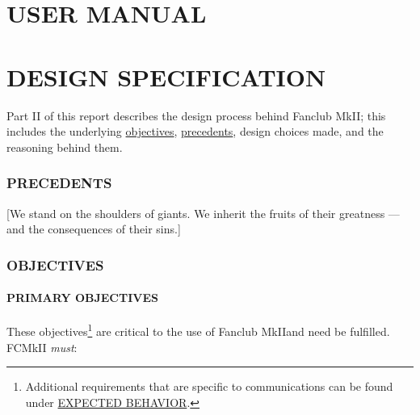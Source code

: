 \documentclass{article}
\newcommand{\fc}{FCMkII}
\newcommand{\Fc}{Fanclub MkII}
\begin{document}
\pagebreak
\part{USER MANUAL}


\pagebreak
\part{DESIGN SPECIFICATION}
\label{pDS}
Part II of this report describes the design process behind \Fc; this includes the underlying \hyperref[sec:Objs]{objectives}, \hyperref[sec:Pres]{precedents}, design choices made, and the reasoning behind them.

\section{PRECEDENTS}
\label{sec:Pres}
[We stand on the shoulders of giants. We inherit the fruits of their greatness --- and the consequences of their sins.]\pagebreak

\section{OBJECTIVES}
\label{sec:Objs}

\subsection{PRIMARY OBJECTIVES} %
\label{ssec:PObjs}
These objectives\footnote{Additional requirements that are specific to communications can be found under \hyperref[sssec:ExpB]{EXPECTED BEHAVIOR}.} are critical to the use of \Fc\space and need be fulfilled. \fc \emph{ must}:
\end{document}
